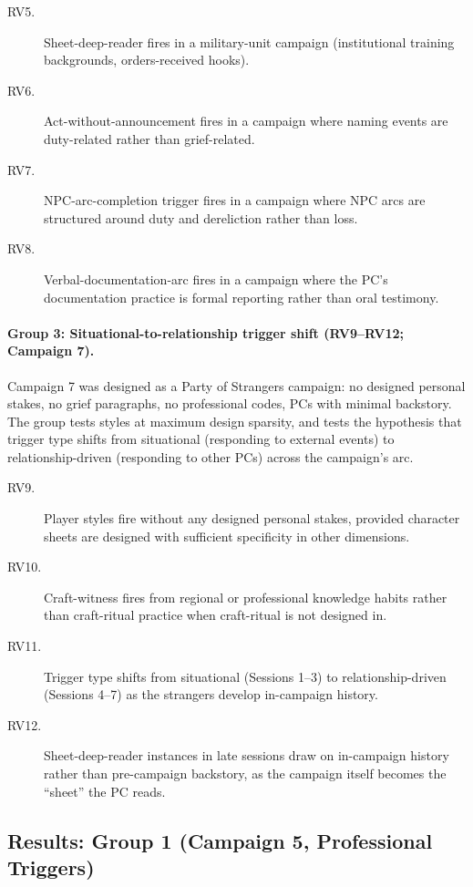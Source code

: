 \begin{description}
  \item[RV5.] Sheet-deep-reader fires in a military-unit campaign (institutional
    training backgrounds, orders-received hooks).
  \item[RV6.] Act-without-announcement fires in a campaign where naming events
    are duty-related rather than grief-related.
  \item[RV7.] NPC-arc-completion trigger fires in a campaign where NPC arcs are
    structured around duty and dereliction rather than loss.
  \item[RV8.] Verbal-documentation-arc fires in a campaign where the PC's documentation
    practice is formal reporting rather than oral testimony.
\end{description}

\paragraph{Group 3: Situational-to-relationship trigger shift (RV9--RV12; Campaign 7).}
Campaign 7 was designed as a Party of Strangers campaign: no designed personal stakes,
no grief paragraphs, no professional codes, PCs with minimal backstory. The group
tests styles at maximum design sparsity, and tests the hypothesis that trigger type
shifts from situational (responding to external events) to relationship-driven
(responding to other PCs) across the campaign's arc.

\begin{description}
  \item[RV9.] Player styles fire without any designed personal stakes, provided
    character sheets are designed with sufficient specificity in other dimensions.
  \item[RV10.] Craft-witness fires from regional or professional knowledge habits
    rather than craft-ritual practice when craft-ritual is not designed in.
  \item[RV11.] Trigger type shifts from situational (Sessions 1--3) to
    relationship-driven (Sessions 4--7) as the strangers develop in-campaign history.
  \item[RV12.] Sheet-deep-reader instances in late sessions draw on in-campaign
    history rather than pre-campaign backstory, as the campaign itself becomes the
    ``sheet'' the PC reads.
\end{description}

\subsection{Results: Group 1 (Campaign 5, Professional Triggers)}

